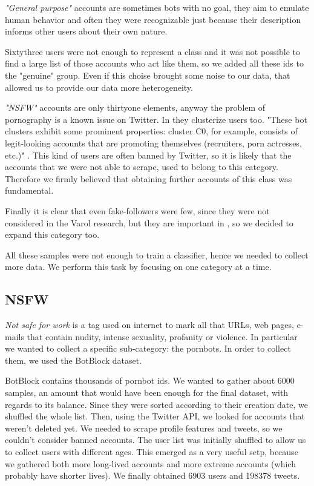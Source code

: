 \emph{"General purpose"} accounts are sometimes bots with no goal, they aim to emulate human behavior and often they were recognizable just because their description informs other users about their own nature.

Sixtythree users were not enough to represent a class and it was not possible to find a large list of those accounts who act like them, so we added all these ids to the "genuine" group. Even if this choise brought some noise to our data, that allowed us to provide our data more heterogeneity.

\emph{"NSFW"} accounts are only thirtyone elements, anyway the problem of pornography is a known issue on Twitter. In \cite{Varol} they clusterize users too. "These bot clusters exhibit some prominent properties: cluster C0, for example, consists of legit-looking accounts that are promoting themselves (recruiters, porn actresses, etc.)" \cite{Varol}.
This kind of users are often banned by Twitter, so it is likely that the accounts that we were not able to scrape, used to belong to this category.
Therefore we firmly believed that obtaining further accounts of this class was fundamental.

Finally it is clear that even fake-followers were few, since they were not considered in the Varol research, but they are important in \cite{Cresci}, so we decided to expand this category too.

All these samples were not enough to train a classifier, hence we needed to collect more data. We perform this task by focusing on one category at a time.

\subsection{NSFW}
\emph{Not safe for work} is a tag used on internet to mark all that URLs, web pages, e-mails that contain nudity, intense sexuality, profanity or violence. In particular we wanted to collect a specific sub-category: the pornbots. In order to collect them, we used the BotBlock dataset.

BotBlock contains thousands of pornbot ids. We wanted to gather about 6000 samples, an amount that would have been enough for the final dataset, with regards to its balance.
Since they were sorted according to their creation date, we shuffled the whole list. Then, using the Twitter API, we looked for accounts that weren't deleted yet. 
We needed to scrape profile features and tweets, so we couldn't consider banned accounts. The user list was initially shuffled to allow us to collect users with different ages. This emerged as a very useful setp, because we gathered both more long-lived accounts and more extreme accounts (which probably have shorter lives). We finally obtained 6903 users and 198378 tweets.

